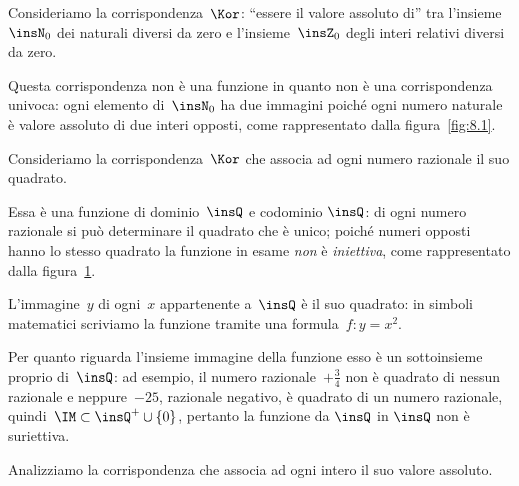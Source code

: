 \begin{exrig}
 \begin{esempio}
 \label{ex:8.3}
Consideriamo la corrispondenza~$\Kor$: ``essere il valore assoluto di'' tra l'insieme~$\insN_0$ dei naturali diversi da zero e l'insieme~$\insZ_0$ degli interi
relativi diversi da zero.

Questa corrispondenza non è una
funzione in quanto non è una corrispondenza univoca: ogni elemento di~$\insN_0$ ha due immagini
poiché ogni numero naturale è valore assoluto di due interi
opposti, come rappresentato dalla figura~\ref{fig:8.1}.
\end{esempio}

\begin{figure}[b]
 \begin{minipage}[t]{.45\textwidth}
\centering
 
\caption{}\label{fig:8.1}
 \end{minipage}\hfil
 \begin{minipage}[t]{.45\textwidth}
\centering
 
\caption{}\label{fig:8.2}
 \end{minipage}
\end{figure}

 \begin{esempio}
 \label{ex:8.4}
 Consideriamo la corrispondenza~$\Kor$ che associa ad ogni numero razionale il suo quadrato.

Essa è una funzione di
dominio~$\insQ$ e codominio $\insQ$: di ogni numero razionale si può
determinare il quadrato che è unico; poiché numeri opposti hanno lo
stesso quadrato la funzione in esame \emph{non} è
\emph{iniettiva}, come rappresentato dalla figura~\ref{fig:8.2}.

L'immagine~$y$ di ogni~$x$ appartenente a~$\insQ$ è il suo
quadrato: in simboli matematici scriviamo la funzione tramite una
formula~$f: y = x^{2}$.

Per quanto riguarda l'insieme immagine
della funzione esso è un sottoinsieme proprio di~$\insQ$: ad esempio, il numero razionale~$+{\frac{3}{4}}$ non è quadrato di
nessun razionale e neppure~$-25$, razionale negativo, è quadrato di
un numero razionale, quindi~$\IM\subset\insQ^{+}\cup\{0\}$, pertanto la funzione da $\insQ$ in $\insQ$ non è suriettiva.
 \end{esempio}

 \begin{esempio}
 \label{ex:8.5}
 Analizziamo la corrispondenza che associa ad ogni intero il suo valore assoluto.


\end{esempio}
\end{exrig}
